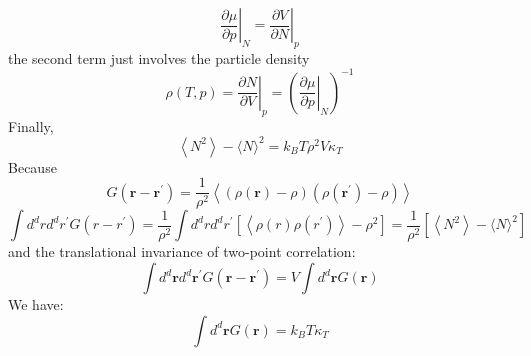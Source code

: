 \documentclass[12pt,titlepage]{article}
\numberwithin{equation}{section}
\begin{document}
\begin{equation}
\left.\frac{\partial \mu}{\partial p}\right|_{N}=\left.\frac{\partial V}{\partial N}\right|_{p}
\end{equation}
the second term just involves the particle density
\begin{equation}
\rho(T, p)=\left.\frac{\partial N}{\partial V}\right|_{p}=\left(\left.\frac{\partial \mu}{\partial p}\right|_{ N }\right)^{-1}
\end{equation}
Finally, 
\begin{equation}
\left\langle N^{2}\right\rangle-\langle N\rangle^{2}=k_{B} T \rho^{2} V \kappa_{T}
\end{equation}
Because
\begin{equation}
G\left(\mathbf{r}-\mathbf{r}^{\prime}\right)=\frac{1}{\rho^{2}}\left\langle(\rho(\mathbf{r})-\rho)\left(\rho\left(\mathbf{r}^{\prime}\right)-\rho\right)\right\rangle
\end{equation}
\begin{equation}
\int d^{d} r d^{d} r^{\prime} G\left(r-r^{\prime}\right)=\frac{1}{\rho^{2}} \int d^{d} r d^{d} r^{\prime}\left[\left\langle\rho(r) \rho\left(r^{\prime}\right)\right\rangle-\rho^{2}\right]=\frac{1}{\rho^{2}}\left[\left\langle N^{2}\right\rangle-\langle N\rangle^{2}\right]
\end{equation}
and the translational invariance of two-point correlation:
\begin{equation}
\int d^{d} \mathbf{r} d^{d} \mathbf{r}^{\prime} G\left(\mathbf{r}-\mathbf{r}^{\prime}\right)=V \int d^{d} \mathbf{r} G(\mathbf{r})
\end{equation}
We have:
\begin{equation}
\int d^{d} \mathbf{r} G(\mathbf{r})=k_{B} T \kappa_{T}
\end{equation}
\end{document}
